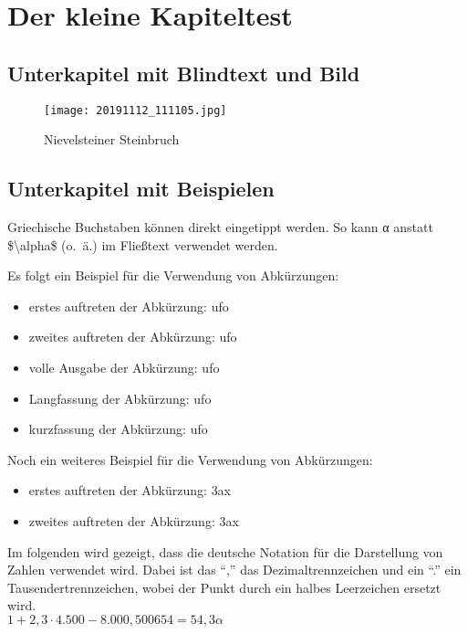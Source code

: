 \chapter{Der kleine Kapiteltest}
	\blindtext

\section{Unterkapitel mit Blindtext und Bild}
	\blindtext
	
	
	\begin{figure}[h]
		\centering
		\texttt{[image: 20191112\_111105.jpg]}  %
		\caption{Nievelsteiner Steinbruch}
		\label{fig:20191112111105}
	\end{figure}


\section{Unterkapitel mit Beispielen}
	Griechische Buchstaben können direkt eingetippt werden. So kann α anstatt \$\textbackslash alpha\$ (o.~ä.) im Fließtext verwendet werden.
	
	Es folgt ein Beispiel für die Verwendung von Abkürzungen:
	\begin{itemize}
		\item erstes auftreten der Abkürzung: \ac{ufo}
		\item zweites auftreten der Abkürzung: \ac{ufo}
		\item volle Ausgabe der Abkürzung: \acf{ufo}
		\item Langfassung der Abkürzung: \acl{ufo}
		\item kurzfassung der Abkürzung: \acs{ufo}
	\end{itemize}
	
	Noch ein weiteres Beispiel für die Verwendung von Abkürzungen:
	\begin{itemize}
		\item erstes auftreten der Abkürzung: \ac{3ax}
		\item zweites auftreten der Abkürzung: \ac{3ax}
	\end{itemize}
	
	Im folgenden wird gezeigt, dass die deutsche Notation für die Darstellung von Zahlen verwendet wird. Dabei ist das ``,'' das Dezimaltrennzeichen und ein ``.'' ein Tausendertrennzeichen, wobei der Punkt durch ein halbes Leerzeichen ersetzt wird.\\
	\begin{math}
		1 + 2,3\cdot 4.500 - 8.000,500654 = 54,3 \alpha
	\end{math}
	
